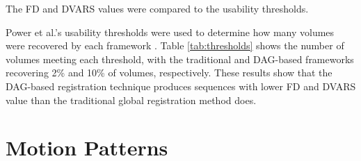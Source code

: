 The FD and DVARS values were compared to the usability thresholds. 

Power et al.'s usability thresholds were used to determine how many volumes were recovered by each framework \cite{Power2014}. Table \ref{tab:thresholds} shows the number of volumes meeting each threshold, with the traditional and DAG-based frameworks recovering 2\% and 10\% of volumes, respectively. These results show that the DAG-based registration technique produces sequences with lower FD and DVARS value than the traditional global registration method does.

\section{Motion Patterns}
